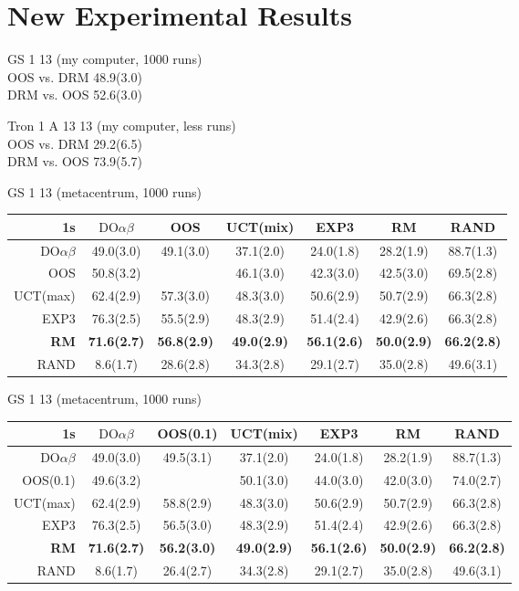 \documentclass[preprint,12pt]{elsarticle}
\newcommand{\doab}[0]{\textrm{DO}\alpha\beta}
\begin{document}
\section{New Experimental Results}
\begin{scriptsize}
GS 1 13 (my computer, 1000 runs)\\
OOS vs. DRM   48.9(3.0)\\
DRM vs. OOS   52.6(3.0)


Tron 1 A 13 13 (my computer, less runs)\\
OOS vs. DRM   29.2(6.5)\\
DRM vs. OOS   73.9(5.7)

GS 1 13 (metacentrum, 1000 runs)\\
\begin{tabular}{|r|cccccc|}\hline
1s&$\doab$&OOS&UCT(mix)&EXP3&RM&RAND\\\hline
$\doab$&49.0(3.0)&49.1(3.0)&37.1(2.0)&24.0(1.8)&28.2(1.9)&88.7(1.3)\\
OOS&50.8(3.2)&&46.1(3.0)&42.3(3.0)&42.5(3.0)&69.5(2.8)\\
UCT(max)&62.4(2.9)&57.3(3.0)&48.3(3.0)&50.6(2.9)&50.7(2.9)&66.3(2.8)\\
EXP3&76.3(2.5)&55.5(2.9)&48.3(2.9)&51.4(2.4)&42.9(2.6)&66.3(2.8)\\
\textbf{RM}&\textbf{71.6(2.7)}&\textbf{56.8(2.9)}&\textbf{49.0(2.9)}&\textbf{56.1(2.6)}&\textbf{50.0(2.9)}&\textbf{66.2(2.8)}\\
RAND&8.6(1.7)&28.6(2.8)&34.3(2.8)&29.1(2.7)&35.0(2.8)&49.6(3.1)\\
\hline
\end{tabular}

GS 1 13 (metacentrum, 1000 runs)\\
\begin{tabular}{|r|cccccc|}\hline
1s&$\doab$&OOS(0.1)&UCT(mix)&EXP3&RM&RAND\\\hline
$\doab$&49.0(3.0)&49.5(3.1)&37.1(2.0)&24.0(1.8)&28.2(1.9)&88.7(1.3)\\
OOS(0.1)&49.6(3.2)&&50.1(3.0)&44.0(3.0)&42.0(3.0)&74.0(2.7)\\
UCT(max)&62.4(2.9)&58.8(2.9)&48.3(3.0)&50.6(2.9)&50.7(2.9)&66.3(2.8)\\
EXP3&76.3(2.5)&56.5(3.0)&48.3(2.9)&51.4(2.4)&42.9(2.6)&66.3(2.8)\\
\textbf{RM}&\textbf{71.6(2.7)}&\textbf{56.2(3.0)}&\textbf{49.0(2.9)}&\textbf{56.1(2.6)}&\textbf{50.0(2.9)}&\textbf{66.2(2.8)}\\
RAND&8.6(1.7)&26.4(2.7)&34.3(2.8)&29.1(2.7)&35.0(2.8)&49.6(3.1)\\
\hline
\end{tabular}


\end{scriptsize}
\end{document}

